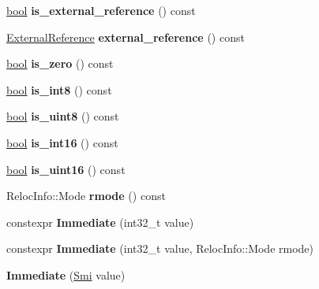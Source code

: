 \begin{DoxyCompactItemize}
\item 
\mbox{\label{classv8_1_1internal_1_1Immediate_a107b07a10e0734678049103dba06ff00}} 
\mbox{\hyperlink{classbool}{bool}} {\bfseries is\+\_\+external\+\_\+reference} () const
\item 
\mbox{\label{classv8_1_1internal_1_1Immediate_a2f14650d1fe9b4768cb4056151e3ddb2}} 
\mbox{\hyperlink{classv8_1_1internal_1_1ExternalReference}{External\+Reference}} {\bfseries external\+\_\+reference} () const
\item 
\mbox{\label{classv8_1_1internal_1_1Immediate_a56c79d3d405603f0bb3ba8d72fcf32df}} 
\mbox{\hyperlink{classbool}{bool}} {\bfseries is\+\_\+zero} () const
\item 
\mbox{\label{classv8_1_1internal_1_1Immediate_a24acaaf50bd60f7cb3dd6ad37092722a}} 
\mbox{\hyperlink{classbool}{bool}} {\bfseries is\+\_\+int8} () const
\item 
\mbox{\label{classv8_1_1internal_1_1Immediate_a832692c33acdfb52933271a003b8f8af}} 
\mbox{\hyperlink{classbool}{bool}} {\bfseries is\+\_\+uint8} () const
\item 
\mbox{\label{classv8_1_1internal_1_1Immediate_a5e27b5d5e940f4f6ec575d477247307d}} 
\mbox{\hyperlink{classbool}{bool}} {\bfseries is\+\_\+int16} () const
\item 
\mbox{\label{classv8_1_1internal_1_1Immediate_a2bd2657523baadb696530101bb68f7c2}} 
\mbox{\hyperlink{classbool}{bool}} {\bfseries is\+\_\+uint16} () const
\item 
\mbox{\label{classv8_1_1internal_1_1Immediate_ad5593304386226357a170928a136bdba}} 
Reloc\+Info\+::\+Mode {\bfseries rmode} () const
\item 
\mbox{\label{classv8_1_1internal_1_1Immediate_a41d43192d4da4a7345227e863739d3ea}} 
constexpr {\bfseries Immediate} (int32\+\_\+t value)
\item 
\mbox{\label{classv8_1_1internal_1_1Immediate_aaf2ad48bb63a59ff142728ecf9507d47}} 
constexpr {\bfseries Immediate} (int32\+\_\+t value, Reloc\+Info\+::\+Mode rmode)
\item 
\mbox{\label{classv8_1_1internal_1_1Immediate_afd2b8993f0dcc7b31cedbe8401af4383}} 
{\bfseries Immediate} (\mbox{\hyperlink{classv8_1_1internal_1_1Smi}{Smi}} value)
\end{DoxyCompactItemize}

